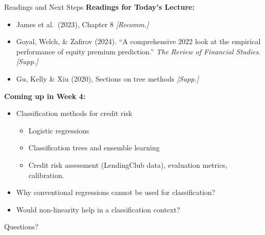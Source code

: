\documentclass[10pt]{beamer}
\begin{document}
\begin{frame}{Readings and Next Steps}
  \textbf{Readings for Today's Lecture:}
  \begin{itemize}
    \item James et al.\ (2023), Chapter 8 \hfill \textit{[Recomm.]}
    \item Goyal, Welch, \& Zafirov (2024). ``A comprehensive 2022 look at the empirical performance of equity premium prediction.'' \emph{The Review of Financial Studies}.\hfill \textit{[Supp.]}
    \item Gu, Kelly \& Xiu (2020), Sections on tree methods \hfill \textit{[Supp.]}
  \end{itemize}

  \vspace{1em}
  \textbf{Coming up in Week 4:}
  \begin{itemize}
    \item Classification methods for credit risk
    \begin{itemize}
      \item Logistic regressions
      \item Classification trees and ensemble learning
      \item Credit risk assessment (LendingClub data), evaluation metrics, calibration.
    \end{itemize}
    \item Why conventional regressions cannot be used for classification?
    \item Would non-linearity help in a classification context?
  \end{itemize}
\end{frame}


\begin{frame}[plain]
  \centering
  \vfill
  {\Large Questions?}
  \vfill
\end{frame}
\end{document}

